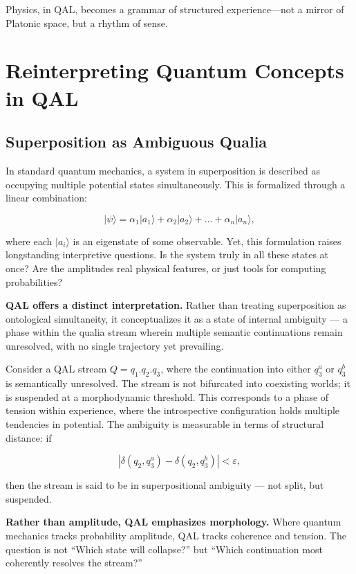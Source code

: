 \documentclass[11pt]{article}
\numberwithin{equation}{section} %
\begin{document}
Physics, in QAL, becomes a grammar of structured experience---not a mirror of Platonic space, but a rhythm of sense.

\section{Reinterpreting Quantum Concepts in QAL}

\subsection{Superposition as Ambiguous Qualia}

In standard quantum mechanics, a system in superposition is described as occupying multiple potential states simultaneously. This is formalized through a linear combination:

\begin{equation}
|\psi\rangle = \alpha_1 |a_1\rangle + \alpha_2 |a_2\rangle + \dots + \alpha_n |a_n\rangle,
\end{equation}

\noindent where each \( |a_i\rangle \) is an eigenstate of some observable. Yet, this formulation raises longstanding interpretive questions. Is the system truly in all these states at once? Are the amplitudes real physical features, or just tools for computing probabilities?

\textbf{QAL offers a distinct interpretation.} Rather than treating superposition as ontological simultaneity, it conceptualizes it as a state of internal ambiguity --- a phase within the qualia stream wherein multiple semantic continuations remain unresolved, with no single trajectory yet prevailing.

Consider a QAL stream \( Q = q_1 . q_2 . q_3 \), where the continuation into either \( q_3^a \) or \( q_3^b \) is semantically unresolved. The stream is not bifurcated into coexisting worlds; it is suspended at a morphodynamic threshold. This corresponds to a phase of tension within experience, where the introspective configuration holds multiple tendencies in potential. The ambiguity is measurable in terms of structural distance: if

\begin{equation}
|\delta(q_2, q_3^a) - \delta(q_2, q_3^b)| < \varepsilon,
\end{equation}

then the stream is said to be in superpositional ambiguity — not split, but suspended.

\textbf{Rather than amplitude, QAL emphasizes morphology.} Where quantum mechanics tracks probability amplitude, QAL tracks coherence and tension. The question is not “Which state will collapse?” but “Which continuation most coherently resolves the stream?”
\end{document}
